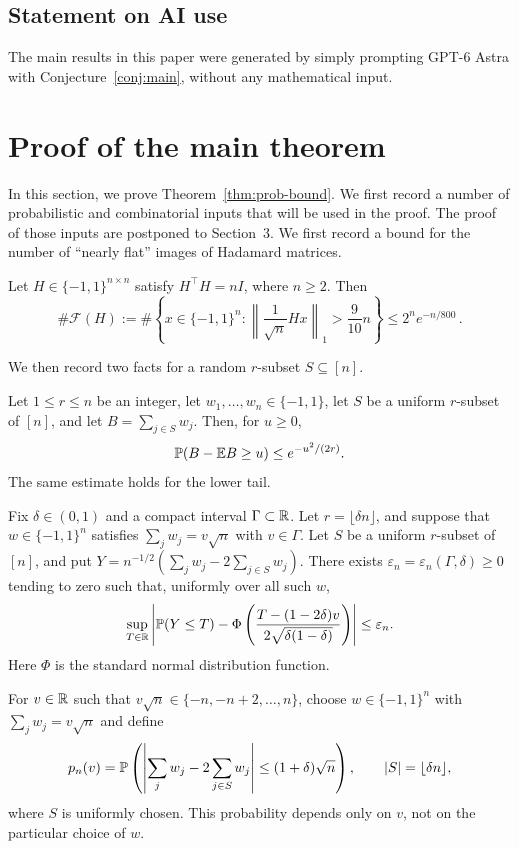 \documentclass[11pt,reqno]{amsart}
\begin{document}
\subsection*{Statement on AI use}

The main results in this paper were generated by simply prompting GPT-6 Astra with Conjecture~\ref{conj:main}, without any mathematical input. 


\section{Proof of the main theorem}

In this section, we prove Theorem~\ref{thm:prob-bound}. We first record a number of probabilistic and combinatorial inputs that will be used in the proof. The proof of those inputs are postponed to Section~3.
We first record a bound for the number of ``nearly flat'' images of Hadamard matrices.
\begin{lem}\label{lem:count}
    Let $H\in\{-1,1\}^{n\times n}$ satisfy $H^{\top}H=nI$, where $n\ge2$. Then
    \[
        \#\mathcal F(H):=\#\left\{ x\in\{-1,1\}^n: \left\|\frac{1}{\sqrt n} Hx\right\|_1> \frac9{10}n \right\} \le 2^n e^{-n/800} \,.
    \]
\end{lem}
We then record two facts for a random $r$-subset $S \subseteq [n]$.
\begin{lem}\label{lem:tail}
    Let $1\le r\le n$ be an integer, let $w_1,\ldots,w_n\in\{-1,1\}$, let $S$ be a uniform $r$-subset of $[n]$, and let $B=\sum_{j\in S}w_j$. Then, for $u\ge0$,
    \[
         {\mathbb{P}}(B-{\mathbb{E}} B\ge u)\le e^{-u^2/(2r)}.
    \]
    The same estimate holds for the lower tail.
\end{lem}
\begin{lem}\label{lem:clt}
    Fix $\delta\in(0,1)$ and a compact interval $\Gamma\subset{\mathbb{R}}$.
    Let $r=\lfloor\delta n\rfloor$, and suppose that
    $w\in\{-1,1\}^n$ satisfies $\sum_jw_j=v\sqrt n$ with
    $v\in\Gamma$. Let $S$ be a uniform $r$-subset of $[n]$, and put
    $Y=n^{-1/2}(\sum_jw_j-2\sum_{j\in S}w_j)$.
    There exists $\varepsilon_n=\varepsilon_n(\Gamma,\delta)\ge0$
    tending to zero such that, uniformly over all such $w$,
    \[
        \sup_{T\in{\mathbb{R}}}\left|
        {\mathbb{P}}(Y\le T)-
        \Phi\left(\frac{T-(1-2\delta)v}
        {2\sqrt{\delta(1-\delta)}}\right)
        \right|\le\varepsilon_n.
    \]
    Here $\Phi$ is the standard normal distribution function.
\end{lem}

For $v\in{\mathbb{R}}$ such that
$v\sqrt n\in\{-n,-n+2,\ldots,n\}$, choose
$w\in\{-1,1\}^n$ with $\sum_jw_j=v\sqrt n$ and define
\[
    p_n(v)={\mathbb{P}}\left(
        \left|\sum_jw_j-2\sum_{j\in S}w_j\right|
        \le(1+\delta)\sqrt n\right),
    \qquad |S|=\lfloor\delta n\rfloor,
\]
where $S$ is uniformly chosen. This probability depends only on $v$,
not on the particular choice of $w$.
\end{document}
